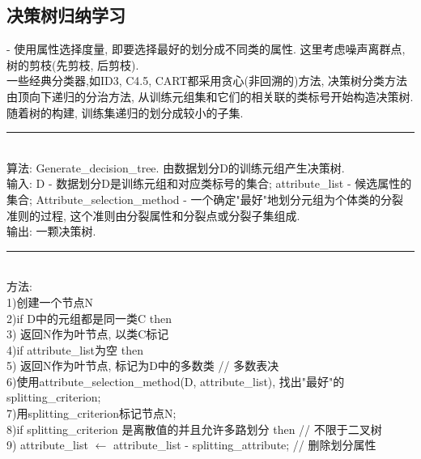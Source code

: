 \documentclass[a4paper,10pt,english]{article}
\begin{document}
\subsection{决策树归纳学习}
\begin{description}
\item {-}
\small{
使用属性选择度量, 即要选择最好的划分成不同类的属性. 这里考虑噪声离群点, 树的剪枝(先剪枝, 后剪枝).\\
一些经典分类器,如ID3, C4.5, CART都采用贪心(非回溯的)方法, 决策树分类方法由顶向下递归的分治方法, 从训练元组集和它们的相关联的类标号开始构造决策树. 随着树的构建, 训练集递归的划分成较小的子集.
}
\end{description}
\rule{16cm}{1pt} \\
算法: Generate\_decision\_tree. 由数据划分D的训练元组产生决策树. \\
输入: D - 数据划分D是训练元组和对应类标号的集合; attribute\_list - 候选属性的集合; Attribute\_selection\_method - 一个确定"最好"地划分元组为个体类的分裂准则的过程, 这个准则由分裂属性和分裂点或分裂子集组成. \\
输出: 一颗决策树.\\
\rule{16cm}{1pt} \\
方法: \\
1)\hspace{3em}创建一个节点N      \\
2)\hspace{3em}if D中的元组都是同一类C then    \\
3)\hspace{6em}    返回N作为叶节点, 以类C标记          \\
4)\hspace{3em}if attribute\_list为空 then \\
5)\hspace{6em}    返回N作为叶节点, 标记为D中的多数类     // 多数表决 \\
6)\hspace{3em}使用attribute\_selection\_method(D, attribute\_list), 找出"最好"的splitting\_criterion;\\
7)\hspace{3em}用splitting\_criterion标记节点N;\\
8)\hspace{3em}if splitting\_criterion 是离散值的并且允许多路划分 then // 不限于二叉树\\
9)\hspace{6em}    attribute\_list $\leftarrow$ attribute\_list - splitting\_attribute; // 删除划分属性 \\
\end{document}
